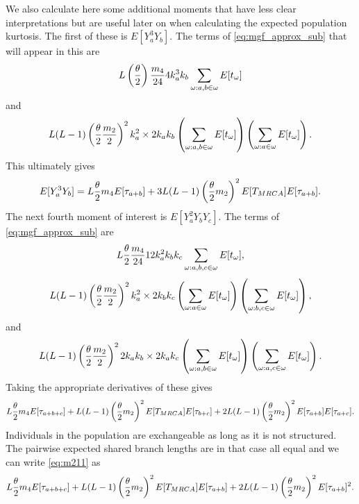 We also calculate here some additional moments that have less clear
interpretations but are useful later on when calculating the expected population
kurtosis. The first of these is $E[Y_a^3Y_b]$. The terms of
\eqref{eq:mgf_approx_sub} that will appear in this are
\begin{equation*}
  L \left(\frac{\theta}{2}\right) \frac{m_4}{24} 4 k_a^3k_b \sum_{\omega:a,b \in \omega} E[t_\omega]
\end{equation*}
and
\begin{equation*}
  L(L-1)\left(\frac{\theta}{2} \frac{m_2}{2}\right)^2 k_a^2 \times 2k_ak_b
  \left( \sum_{\omega:a,b \in \omega} E[t_\omega] \right) \left( \sum_{\omega: a \in \omega} E[t_\omega] \right).
\end{equation*}
This ultimately gives
\begin{equation}
  \label{eq:m31}
  E[Y_a^3Y_b] = L \frac{\theta}{2} m_4 E[\tau_{a+b}] + 3L(L-1) \left(\frac{\theta}{2} m_2\right)^2 E[T_{MRCA}]E[\tau_{a+b}].
\end{equation}
The next fourth moment of interest is $E[Y_a^2Y_bY_c]$. The terms of
\eqref{eq:mgf_approx_sub} are
\begin{equation*}
  L \frac{\theta}{2} \frac{m_4}{24} 12k_a^2k_bk_c \sum_{\omega: a,b,c \in \omega} E[t_\omega],
\end{equation*}
\begin{equation*}
  L(L-1) \left(\frac{\theta}{2} \frac{m_2}{2}\right)^2 k_a^2 \times 2k_bk_c
  \left( \sum_{\omega: a \in \omega} E[t_\omega] \right)\left( \sum_{\omega: b,c \in \omega} E[t_\omega] \right),
\end{equation*}
and 
\begin{equation*}
  L(L-1) \left(\frac{\theta}{2} \frac{m_2}{2}\right)^2 2k_ak_b \times 2k_ak_c \left( \sum_{\omega: a,b \in \omega} E[t_\omega] \right)
  \left( \sum_{\omega: a,c \in \omega} E[t_\omega] \right).
\end{equation*}
Taking the appropriate derivatives of these gives
\begin{equation}
  \label{eq:m211}
  L \frac{\theta}{2} m_4 E[\tau_{a+b+c}] + L(L-1)\left(\frac{\theta}{2} m_2\right)^2E[T_{MRCA}]E[\tau_{b+c}] +
  2L(L-1) \left(\frac{\theta}{2} m_2\right)^2E[\tau_{a+b}]E[\tau_{a+c}].
\end{equation}
Individuals in the population are exchangeable as long as it is not structured.
The pairwise expected shared branch lengths are in that case all equal and we
can write \eqref{eq:m211} as
\begin{equation}
  \label{eq:m211s}
  L \frac{\theta}{2} m_4 E[\tau_{a+b+c}] + L(L-1)\left(\frac{\theta}{2} m_2\right)^2E[T_{MRCA}]E[\tau_{a+b}] +
  2L(L-1) \left(\frac{\theta}{2} m_2\right)^2E[\tau_{a+b}]^2.
\end{equation}
